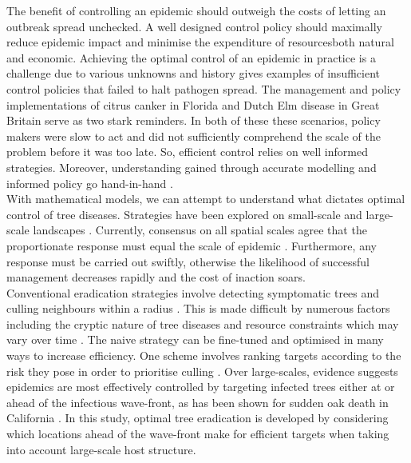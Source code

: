 
The benefit of controlling an epidemic should outweigh the costs of letting an outbreak spread unchecked. A well designed control policy should maximally reduce epidemic impact and minimise the expenditure of resources\textemdash both natural and economic. Achieving the optimal control of an epidemic in practice is a challenge due to various unknowns \cite{13-challenges} and history gives examples of insufficient control policies that failed to halt pathogen spread. The management and policy implementations of citrus canker in Florida \cite{schubert2001meeting} and Dutch Elm disease in Great Britain \cite{dutch-elm-mismanage} serve as two stark reminders. In both of these these scenarios, policy makers were slow to act and did not sufficiently comprehend the scale of the problem before it was too late. So, efficient control relies on well informed strategies. Moreover, understanding gained through accurate modelling and informed policy go hand-in-hand \cite{jones2020modelling}.\\

With mathematical models, we can attempt to understand what dictates optimal control of tree diseases. Strategies have been explored on small-scale \cite{risk-potential-control, WEBIDEMICS} and large-scale landscapes \cite{large-scale-control, large-scale-control2}. Currently, consensus on all spatial scales agree that the proportionate response must equal the scale of epidemic \cite{control-scale-matching}. Furthermore, any response must be carried out swiftly, otherwise the likelihood of successful management decreases rapidly and the cost of inaction soars.\\

Conventional eradication strategies involve detecting symptomatic trees and culling neighbours within a radius \cite{WEBIDEMICS}. This is made difficult by numerous factors including the cryptic nature of tree diseases and resource constraints which may vary over time \cite{control-theory, control-theory-application}. The naive strategy can be fine-tuned and optimised in many ways to increase efficiency. One scheme involves ranking targets according to the risk they pose in order to prioritise culling \cite{risk-potential-control}. Over large-scales, evidence suggests epidemics are most effectively controlled by targeting infected trees either at or ahead of the infectious wave-front, as has been shown for sudden oak death in California \cite{large-scale-control}. In this study, optimal tree eradication is developed by considering which locations ahead of the wave-front make for efficient targets when taking into account large-scale host structure.

